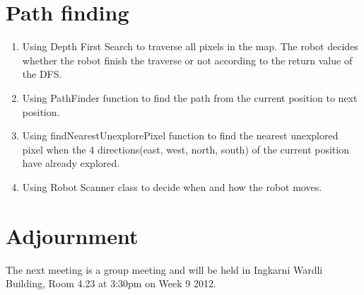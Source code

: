 \documentclass[11pt, a4paper]{article}
\begin{document}
\section{Path finding}
\begin{enumerate}
\item Using Depth First Search to traverse all pixels in the map. The robot decides whether the robot finish the traverse or not according to the return value of the DFS.

\item Using PathFinder function to find the path from the current position to next position.

\item Using findNearestUnexplorePixel function to find the nearest unexplored pixel when the 4 directions(east, west, north, south) of the current position have already explored.
\item Using Robot Scanner class to decide when and how the robot moves.

\end{enumerate}    

\section{Adjournment}
The next meeting is a group meeting and will be held in Ingkarni Wardli Building, Room 4.23 at 3:30pm on Week 9 2012.

\vspace*{10pt}
\end{document}
